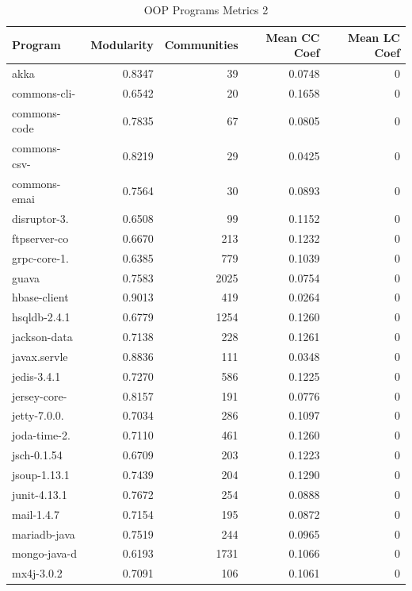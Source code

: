 \documentclass[12pt, a4paper]{article}
\begin{document}
\begin{longtable}[H]{l r r r r}
    \caption{OOP Programs Metrics 2}\label{table:oop_metrics_2}\\
        Program & Modularity & Communities & Mean CC Coef & Mean LC Coef \\
        \hline            
        \endhead
        akka         &  0.8347 &    39 &  0.0748 & 0 \\  
        commons-cli- &  0.6542 &    20 &  0.1658 & 0 \\  
        commons-code &  0.7835 &    67 &  0.0805 & 0 \\  
        commons-csv- &  0.8219 &    29 &  0.0425 & 0 \\  
        commons-emai &  0.7564 &    30 &  0.0893 & 0 \\  
        disruptor-3. &  0.6508 &    99 &  0.1152 & 0 \\  
        ftpserver-co &  0.6670 &   213 &  0.1232 & 0 \\  
        grpc-core-1. &  0.6385 &   779 &  0.1039 & 0 \\  
        guava        &  0.7583 &  2025 &  0.0754 & 0 \\  
        hbase-client &  0.9013 &   419 &  0.0264 & 0 \\  
        hsqldb-2.4.1 &  0.6779 &  1254 &  0.1260 & 0 \\  
        jackson-data &  0.7138 &   228 &  0.1261 & 0 \\  
        javax.servle &  0.8836 &   111 &  0.0348 & 0 \\  
        jedis-3.4.1  &  0.7270 &   586 &  0.1225 & 0 \\  
        jersey-core- &  0.8157 &   191 &  0.0776 & 0 \\  
        jetty-7.0.0. &  0.7034 &   286 &  0.1097 & 0 \\  
        joda-time-2. &  0.7110 &   461 &  0.1260 & 0 \\  
        jsch-0.1.54  &  0.6709 &   203 &  0.1223 & 0 \\  
        jsoup-1.13.1 &  0.7439 &   204 &  0.1290 & 0 \\  
        junit-4.13.1 &  0.7672 &   254 &  0.0888 & 0 \\  
        mail-1.4.7   &  0.7154 &   195 &  0.0872 & 0 \\  
        mariadb-java &  0.7519 &   244 &  0.0965 & 0 \\  
        mongo-java-d &  0.6193 &  1731 &  0.1066 & 0 \\  
        mx4j-3.0.2   &  0.7091 &   106 &  0.1061 & 0 \\  

\end{longtable}
\end{document}
